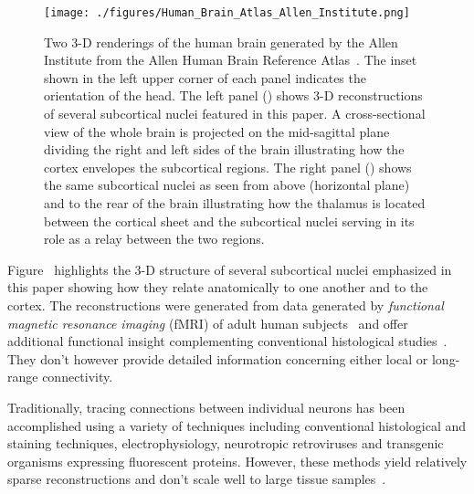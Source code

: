 \begin{figure}
%
  \begin{center} 
    \texttt{[image: ./figures/Human\_Brain\_Atlas\_Allen\_Institute.png]} %
  \end{center}
%
  \caption{Two 3-D renderings of the human brain generated by the Allen Institute {} from the Allen Human Brain Reference Atlas~\cite{HawrylyczetalNATURE-12}. The inset shown in the left upper corner of each panel indicates the orientation of the head. The left panel ({}) shows 3-D reconstructions of several subcortical nuclei featured in this paper. A cross-sectional view of the whole brain is projected on the mid-sagittal plane dividing the right and left sides of the brain illustrating how the cortex envelopes the subcortical regions. The right panel ({}) shows the same subcortical nuclei as seen from above (horizontal plane) and to the rear of the brain illustrating how the thalamus is located between the cortical sheet and the subcortical nuclei serving in its role as a relay between the two regions.}
%
  \label{fig_brains}
%
\end{figure}


Figure~{} highlights the 3-D structure of several subcortical nuclei emphasized in this paper showing how they relate anatomically to one another and to the cortex. The reconstructions were generated from data generated by {\it{functional magnetic resonance imaging}} (fMRI) of adult human subjects~\cite{HawrylyczetalNATURE-12} and offer additional functional insight complementing conventional histological studies~\cite{BridgeandClarePTRS-B-06}. They don't however provide detailed information concerning either local or long-range connectivity.

Traditionally, tracing connections between individual neurons has been accomplished using a variety of techniques including conventional histological and staining techniques, electrophysiology, neurotropic retroviruses and transgenic organisms expressing fluorescent proteins. However, these methods yield relatively sparse reconstructions and don't scale well to large tissue samples~\cite{Arenkiel2014neural,CallawayCURRENT-OPINION-08}.

